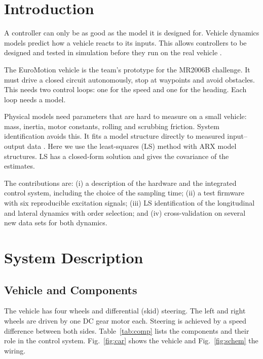 \documentclass[conference]{IEEEtran}
\begin{document}
\section{Introduction}
A controller can only be as good as the model it is designed for.
Vehicle dynamics models predict how a vehicle reacts to its inputs. This
allows controllers to be designed and tested in simulation before they
run on the real vehicle \cite{rajamani,gillespie}.

The EuroMotion vehicle is the team's prototype for the MR2006B challenge.
It must drive a closed circuit autonomously, stop at waypoints and avoid
obstacles. This needs two control loops: one for the speed and one for the
heading. Each loop needs a model.

Physical models need parameters that are hard to measure on a small
vehicle: mass, inertia, motor constants, rolling and scrubbing friction.
System identification avoids this. It fits a model structure directly to
measured input--output data \cite{ljung}. Here we use the least-squares
(LS) method with ARX model structures. LS has a closed-form solution and
gives the covariance of the estimates.

The contributions are:
(i) a description of the hardware and the integrated control system,
including the choice of the sampling time;
(ii) a test firmware with six reproducible excitation signals;
(iii) LS identification of the longitudinal and lateral dynamics with
order selection; and
(iv) cross-validation on several new data sets for both dynamics.

\section{System Description}
\subsection{Vehicle and Components}
The vehicle has four wheels and differential (skid) steering. The left and
right wheels are driven by one DC gear motor each. Steering is achieved by
a speed difference between both sides. Table~\ref{tab:comp} lists the
components and their role in the control system. Fig.~\ref{fig:car} shows
the vehicle and Fig.~\ref{fig:schem} the wiring.
\end{document}
